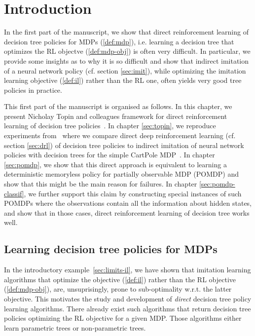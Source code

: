 \chapter{Introduction}\label{sec:intro-pomdp}
In the first part of the manuscript, we show that direct reinforcement learning of decision tree policies for MDPs (\ref{def:mdp}), i.e. learning a decision tree that optimizes the RL objectve (\ref{def:mdp-obj}) is often very difficult.
In particular, we provide some insights as to why it is so difficult and show that indirect imitation of a neural network policy (cf. section \ref{sec:imit}), while optimizing the imitation learning objective (\ref{def:il}) rather than the RL one, often yields very good tree policies in practice.

This first part of the manuscript is organised as follows.
In this chapter, we present Nicholay Topin and colleagues framework for direct reinforcement learning of decision tree policies~\cite{topin2021iterative}.
In chapter \ref{sec:topin}, we reproduce experiments from~\cite{topin2021iterative} where we compare direct deep reinforcement learning (cf. section \ref{sec:drl}) of decision tree policies to indirect imitation of neural network policies with decision trees for the simple CartPole MDP~\cite{cartpole}.
In chapter \ref{sec:pomdp}, we show that this direct approach is equivalent to learning a deterministic memoryless policy for partially observable MDP (POMDP)\cite{POMDP,chap2} and show that this might be the main reason for failures.
In chapter \ref{sec:pomdp-classif}, we further support this claim by constructing special instances of such POMDPs where the observations contain all the information about hidden states, and show that in those cases, direct reinforcement learning of decision tree works well.  

\section{Learning decision tree policies for MDPs}\label{related-work-pomdp}
In the introductory example~\ref{sec:limits-il}, we have shown that imitation learning algorithms that optimize the objective (\ref{def:il}) rather than the RL objective (\ref{def:mdp-obj}), are, unsuprisingly, prone to sub-optimality w.r.t. the latter objective.
This motivates the study and development of \textit{direct} decision tree policy learning algorithms.
There already exist such algorithms that return decision tree policies optimizing the RL objective for a given MDP.
Those algorithms either learn parametric trees or non-parametric trees.

